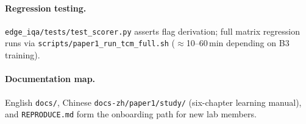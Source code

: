 \paragraph{Regression testing.}
\texttt{edge\_iqa/tests/test\_scorer.py} asserts flag derivation; full matrix regression runs via \texttt{scripts/paper1\_run\_tcm\_full.sh} ($\approx$10--60\,min depending on B3 training).

\paragraph{Documentation map.}
English \texttt{docs/}, Chinese \texttt{docs-zh/paper1/study/} (six-chapter learning manual), and \texttt{REPRODUCE.md} form the onboarding path for new lab members.
